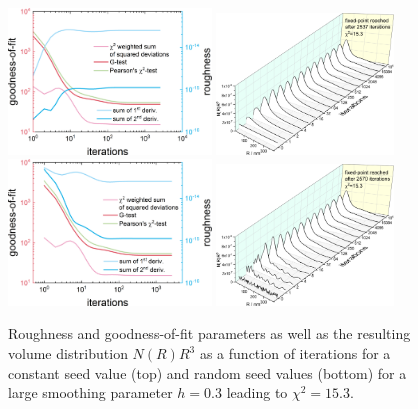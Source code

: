 \begin{figure}[htb]
\centering
\includegraphics[width=0.48\textwidth]{../images/form_factor/EM/EMconstant_seed_smooth_0_3_goodness_of_fit.png}
\hspace{0.06\textwidth}
\includegraphics[width=0.42\textwidth]{../images/form_factor/EM/EMconstant_seed_smooth_0_3_NR.png}
\includegraphics[width=0.48\textwidth]{../images/form_factor/EM/EMrandom_seed_smooth_0_3_goodness_of_fit.png}
\hspace{0.06\textwidth}
\includegraphics[width=0.42\textwidth]{../images/form_factor/EM/EMrandom_seed_smooth_0_3_NR.png}
\caption{Roughness and goodness-of-fit parameters as well as the resulting volume distribution $N(R)R^3$ as a function of iterations for  a constant seed value (top) and random seed values (bottom) for a large smoothing parameter $h=0.3$ leading to $\chi^2=15.3$.\label{fig:EMhlarge}}
\end{figure}

